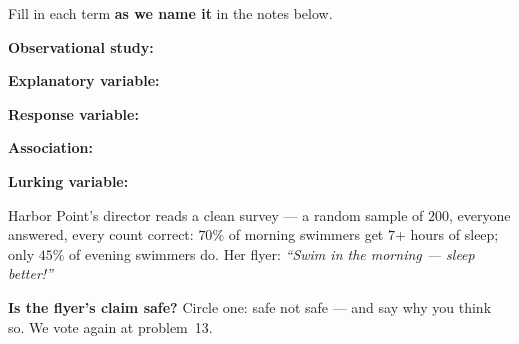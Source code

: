 \documentclass[12pt]{article}
\newcommand{\termrowheight}{2.1cm}
\newlength{\termrowinset}\setlength{\termrowinset}{7pt}
\newcommand{\vterm}[1]{%
  \par\noindent\begin{minipage}[t][\termrowheight][t]{\linewidth}%
    \vspace*{\termrowinset}%
    \textbf{\textcolor{cerulean}{#1:}}%
  \end{minipage}\par}
\begin{document}

\vspace{0.15in}

\begin{vocabbox}
\small
Fill in each term \textbf{as we name it} in the notes below.
\vterm{Observational study}
\vterm{Explanatory variable}
\vterm{Response variable}
\vterm{Association}
\vterm{Lurking variable}
\end{vocabbox}

\boxguard[12]
\begin{hookbox}
\small
Harbor Point's director reads a clean survey --- a random sample of $200$, everyone answered,
every count correct: $70\%$ of morning swimmers get $7$+ hours of sleep; only $45\%$ of evening
swimmers do. Her flyer: \emph{``Swim in the morning --- sleep better!''}

\vspace{3pt}
\textbf{Is the flyer's claim safe?} Circle one: \quad safe \qquad not safe \quad --- and say why
you think so. We vote again at problem~13.
\par{}
\end{hookbox}
\end{document}
